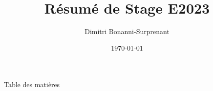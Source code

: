 \documentclass{beamer}
\title{Résumé de Stage E2023}
\author{Dimitri Bonanni-Surprenant}
\date{\today}
\begin{document}

    \begin{frame}
        \titlepage
    \end{frame}

    \logo{}


    \begin{frame}{Table des matières}
        \tableofcontents
    \end{frame}

    
\end{document}
